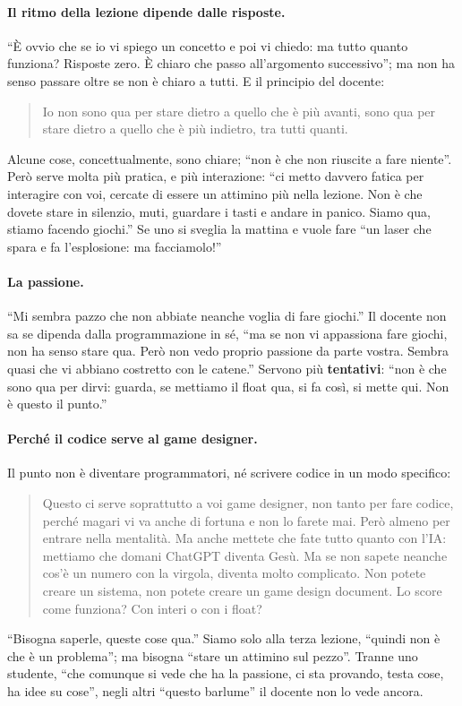 \paragraph{Il ritmo della lezione dipende dalle risposte.} ``È ovvio che se io vi
spiego un concetto e poi vi chiedo: ma tutto quanto funziona? Risposte zero. È
chiaro che passo all'argomento successivo''; ma non ha senso passare oltre se
non è chiaro a tutti. E il principio del docente:
\begin{quote}
Io non sono qua per stare dietro a quello che è più avanti, sono qua per stare
dietro a quello che è più indietro, tra tutti quanti.
\end{quote}
Alcune cose, concettualmente, sono chiare; ``non è che non riuscite a fare
niente''. Però serve molta più pratica, e più interazione: ``ci metto davvero
fatica per interagire con voi, cercate di essere un attimino più nella lezione.
Non è che dovete stare in silenzio, muti, guardare i tasti e andare in panico.
Siamo qua, stiamo facendo giochi.'' Se uno si sveglia la mattina e vuole fare
``un laser che spara e fa l'esplosione: ma facciamolo!''

\paragraph{La passione.} ``Mi sembra pazzo che non abbiate neanche voglia di
fare giochi.'' Il docente non sa se dipenda dalla programmazione in sé, ``ma se
non vi appassiona fare giochi, non ha senso stare qua. Però non vedo proprio
passione da parte vostra. Sembra quasi che vi abbiano costretto con le catene.''
Servono più \textbf{tentativi}: ``non è che sono qua per dirvi: guarda, se
mettiamo il float qua, si fa così, si mette qui. Non è questo il punto.''

\paragraph{Perché il codice serve al game designer.} Il punto non è diventare
programmatori, né scrivere codice in un modo specifico:
\begin{quote}
Questo ci serve soprattutto a voi game designer, non tanto per fare codice,
perché magari vi va anche di fortuna e non lo farete mai. Però almeno per entrare
nella mentalità. Ma anche mettete che fate tutto quanto con l'IA: mettiamo che
domani ChatGPT diventa Gesù. Ma se non sapete neanche cos'è un numero con la
virgola, diventa molto complicato. Non potete creare un sistema, non potete
creare un game design document. Lo score come funziona? Con interi o con i float?
\end{quote}
``Bisogna saperle, queste cose qua.'' Siamo solo alla terza lezione, ``quindi non
è che è un problema''; ma bisogna ``stare un attimino sul pezzo''. Tranne uno
studente, ``che comunque si vede che ha la passione, ci sta provando, testa cose,
ha idee su cose'', negli altri ``questo barlume'' il docente non lo vede ancora.


